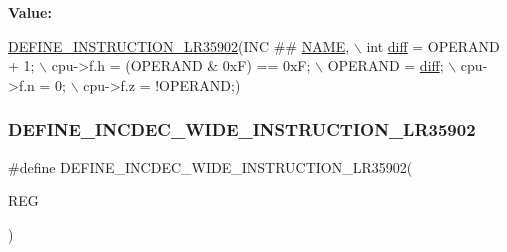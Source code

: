 {\bfseries Value\+:}
\begin{DoxyCode}
\mbox{\hyperlink{isa-lr35902_8c_a3128fc43c5d01e8b51f67901c0b4b5ef}{DEFINE\_INSTRUCTION\_LR35902}}(INC ## \mbox{\hyperlink{inflate_8h_a164ea0159d5f0b5f12a646f25f99eceaa67bc2ced260a8e43805d2480a785d312}{NAME}}, \(\backslash\)
        \textcolor{keywordtype}{int} \mbox{\hyperlink{isa-lr35902_8c_a65f3a8178e1f997a7a19a988bb0f4e1a}{diff}} = OPERAND + 1; \(\backslash\)
        cpu->f.h = (OPERAND & 0xF) == 0xF; \(\backslash\)
        OPERAND = \mbox{\hyperlink{isa-lr35902_8c_a65f3a8178e1f997a7a19a988bb0f4e1a}{diff}}; \(\backslash\)
        cpu->f.n = 0; \(\backslash\)
        cpu->f.z = !OPERAND;)
\end{DoxyCode}
\mbox{\label{isa-lr35902_8c_a709b12a6ba2c47cbef2d4d0e9c72ee2e}} 
\subsubsection{\texorpdfstring{D\+E\+F\+I\+N\+E\+\_\+\+I\+N\+C\+D\+E\+C\+\_\+\+W\+I\+D\+E\+\_\+\+I\+N\+S\+T\+R\+U\+C\+T\+I\+O\+N\+\_\+\+L\+R35902}{DEFINE\_INCDEC\_WIDE\_INSTRUCTION\_LR35902}}
{\footnotesize\ttfamily \#define D\+E\+F\+I\+N\+E\+\_\+\+I\+N\+C\+D\+E\+C\+\_\+\+W\+I\+D\+E\+\_\+\+I\+N\+S\+T\+R\+U\+C\+T\+I\+O\+N\+\_\+\+L\+R35902(\begin{DoxyParamCaption}\item[{}]{R\+EG }\end{DoxyParamCaption})}

